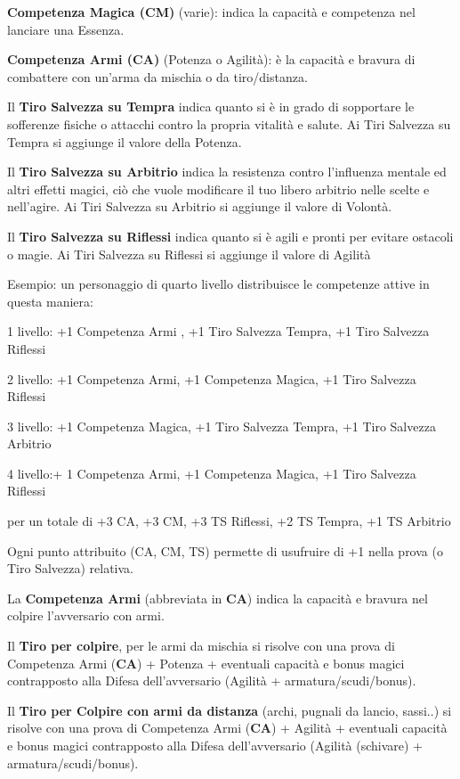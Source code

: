 \documentclass[a4paper,11pt,twoside,openany]{book}
\begin{document}
\textbf{Competenza Magica (CM)} (varie): indica la capacità e competenza nel lanciare una Essenza.

\textbf{Competenza Armi (CA)} (Potenza o Agilità): è la capacità e bravura di combattere con un'arma da mischia o da tiro/distanza.

Il \textbf{Tiro Salvezza su Tempra} indica quanto si è in grado di sopportare le sofferenze fisiche o attacchi contro la propria vitalità e salute. Ai Tiri Salvezza su Tempra si aggiunge il valore della Potenza.

Il \textbf{Tiro Salvezza su Arbitrio} indica la resistenza contro l'influenza mentale ed altri effetti magici, ciò che vuole modificare il tuo libero arbitrio nelle scelte e nell'agire. Ai Tiri Salvezza su Arbitrio si aggiunge il valore di Volontà.

Il \textbf{Tiro Salvezza su Riflessi} indica quanto si è agili e pronti per evitare ostacoli o magie. Ai Tiri Salvezza su Riflessi si aggiunge il valore di Agilità

\bigskip

Esempio: un personaggio di quarto livello distribuisce le competenze
attive in questa maniera:

1 livello: +1 Competenza Armi , +1 Tiro Salvezza Tempra, +1 Tiro Salvezza Riflessi

2 livello: +1 Competenza Armi, +1 Competenza Magica, +1 Tiro Salvezza Riflessi

3 livello: +1 Competenza Magica, +1 Tiro Salvezza Tempra, +1 Tiro Salvezza Arbitrio

4 livello:+ 1 Competenza Armi, +1 Competenza Magica, +1 Tiro Salvezza Riflessi

per un totale di +3 CA, +3 CM, +3 TS Riflessi, +2 TS Tempra, +1 TS Arbitrio

\bigskip

Ogni punto attribuito (CA, CM, TS) permette di usufruire di +1 nella prova (o Tiro Salvezza) relativa.

La \textbf{Competenza Armi} (abbreviata in \textbf{CA}) indica la capacità e bravura nel colpire l'avversario con armi.

Il \textbf{Tiro per colpire}, per le armi da mischia si risolve con una prova di Competenza Armi (\textbf{CA}) + Potenza + eventuali capacità e bonus magici contrapposto alla Difesa dell'avversario (Agilità + armatura/scudi/bonus).

Il \textbf{Tiro per Colpire con armi da distanza} (archi, pugnali da lancio, sassi..) si risolve con una prova di Competenza Armi (\textbf{CA}) + Agilità + eventuali capacità e bonus magici contrapposto alla Difesa dell'avversario (Agilità (schivare) + armatura/scudi/bonus).
\end{document}
